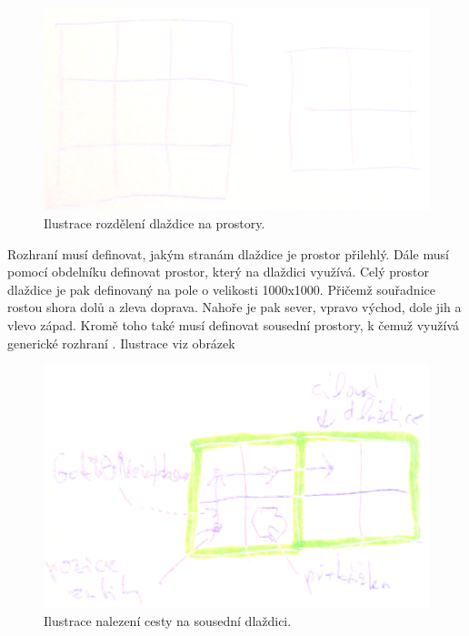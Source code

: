 \begin{figure}[H]\centering
\includegraphics[width=\textwidth]{./img/space-grid.png}
\caption{Ilustrace rozdělení dlaždice na prostory. }
\label{space-grid}
\end{figure}

Rozhraní  musí definovat, jakým stranám dlaždice je prostor přilehlý. Dále musí pomocí obdelníku definovat prostor, který na dlaždici využívá.
Celý prostor dlaždice je pak definovaný na pole o velikosti 1000x1000. Přičemž souřadnice rostou
shora dolů a zleva doprava. Nahoře je pak sever, vpravo východ, dole jih a vlevo západ. Kromě toho také musí definovat sousední
prostory, k čemuž využívá generické rozhraní . Ilustrace viz obrázek 

\begin{figure}[H]\centering
\includegraphics[width=\textwidth]{./img/space-route.png}
\caption{Ilustrace nalezení cesty na sousední dlaždici. }
\label{space-route}
\end{figure}

